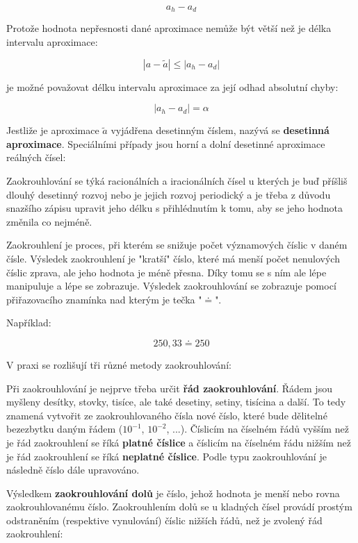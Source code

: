 $$ a_h - a_d $$

Protože hodnota nepřesnosti dané aproximace nemůže být větší než je délka intervalu aproximace:

$$ |a - \tilde{a}| \leq |a_h - a_d| $$

je možné považovat délku intervalu aproximace za její odhad absolutní chyby:

$$  |a_h - a_d| = \alpha $$

Jestliže je aproximace $\tilde{a}$ vyjádřena desetinným číslem, nazývá se {\bf desetinná aproximace}. Speciálními případy jsou horní a dolní desetinné aproximace reálných čísel:


Zaokrouhlování se týká racionálních a iracionálních čísel u kterých je buď příšliš dlouhý desetinný rozvoj nebo je jejich rozvoj periodický a je třeba z důvodu snazšího zápisu upravit jeho délku s přihlédnutím k tomu, aby se jeho hodnota změnila co nejméně.

Zaokrouhlení je proces, při kterém se snižuje počet významových číslic v daném čísle. Výsledek zaokrouhlení je "kratší" číslo, které má menší počet nenulových číslic zprava, ale jeho hodnota je méně přesna. Díky tomu se s ním ale lépe manipuluje a lépe se zobrazuje. Výsledek zaokrouhlování se zobrazuje pomocí přiřazovacího znamínka nad kterým je tečka "$\doteq$".

Například:

$$ 250,33 \doteq 250 $$

V praxi se rozlišují tři různé metody zaokrouhlování:

\vskip 4mm
\vskip 4mm

Při zaokrouhlování je nejprve třeba určit {\bf řád zaokrouhlování}. Řádem jsou myšleny desítky, stovky, tisíce, ale také desetiny, setiny, tisícina a další. To tedy znamená vytvořit ze zaokrouhlovaného čísla nové číslo, které bude dělitelné bezezbytku daným řádem ($10^{-1}$, $10^{-2}$, ...). Číslicím na číselném řádů vyšším než je řád zaokrouhlení se říká {\bf platné číslice} a číslicím na číselném řádu nižším než je řád zaokrouhlení se říká {\bf neplatné číslice}. Podle typu zaokrouhlování je následně číslo dále upravováno.

Výsledkem {\bf zaokrouhlování dolů} je číslo, jehož hodnota je menší nebo rovna zaokrouhlovanému číslo. Zaokrouhlením dolů se u kladných čísel provádí prostým odstraněním (respektive vynulování) číslic nižších řádů, než je zvolený řád zaokrouhlení:

